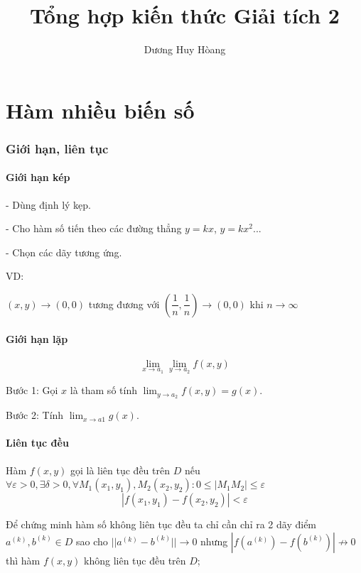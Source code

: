 \documentclass[12pt, a4paper]{article}
\author{Dương Huy Hòang}
\title{Tổng hợp kiến thức Giải tích 2}
\begin{document}
	\begin{titlingpage}
	\maketitle
	\end{titlingpage}
	\pagebreak
	\tableofcontents
	\pagebreak
	\part{Hàm nhiều biến số}
	\section{Giới hạn, liên tục}
	\subsection{Giới hạn kép}
	
	- Dùng định lý kẹp.
	
	- Cho hàm số tiến theo các đường thẳng $y = kx$, $y=kx^2$...
	 
	- Chọn các dãy tương ứng.
	
	VD:
	\begin{center}
	$ (x,y) \to (0,0) $ tương đương với $ (\dfrac{1}{n},\dfrac{1}{n}) \to (0,0) $ khi $n\to \infty$ \\
	\end{center}
	\subsection{Giới hạn lặp}
	\begin{center}
	$$\lim_{x\to a_1}\lim_{y\to a_2}f(x,y)$$
	\end{center}
	
	Bước 1: Gọi $x$ là tham số tính $\lim_{y\to a_2}f(x,y) = g(x)$.
	
	Bước 2: Tính $\lim_{x\to a1} g(x)$.
	
	\subsection{Liên tục đều}
	 Hàm $ f(x,y) $ gọi là liên tục đều trên $D$ nếu $ \forall \varepsilon>0, \exists \delta  > 0,\forall {M_1}({x_1},{y_1}),{M_2}({x_2},{y_2}):0 \le |{M_1}{M_2}| \le \varepsilon   $
	 \[ |f({x_1},{y_1})-f({x_2},{y_2})| < \varepsilon  \]
	 
	 Để chứng minh hàm số không liên tục đều ta chỉ cần chỉ ra 2 dãy điểm $ a^{(k)}, b^{(k)}  \in D $ sao cho $ ||a^{(k)} - b^{(k)}|| \to 0 $ nhưng $ |f(a^{(k)}) - f(b^{(k)})| \nrightarrow 0 $ thì hàm $ f(x,y) $ không liên tục đều trên $ D $;
	 
\end{document}
